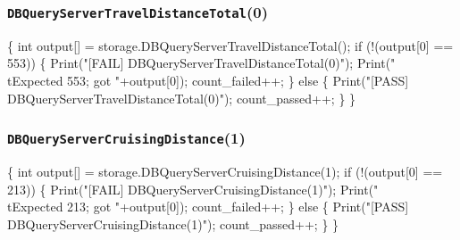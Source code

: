 \documentclass{article}
\def\nwendcode{\endtrivlist \endgroup}
\let\nwdocspar=\par
\theoremstyle{definition}
\begin{document}
\subsubsection{{\tt{}DBQueryServerTravelDistanceTotal}(0)}
\nwenddocs{}\endmoddef{}
\{
  int output[] = storage.DBQueryServerTravelDistanceTotal();
  if (!(output[0] == 553)) \{
    Print("[FAIL] DBQueryServerTravelDistanceTotal(0)");
    Print("\\tExpected 553; got "+output[0]);
    count_failed++;
  \} else \{
    Print("[PASS] DBQueryServerTravelDistanceTotal(0)");
    count_passed++;
  \}
\}
\nwendcode{}\nwdocspar
\subsubsection{{\tt{}DBQueryServerCruisingDistance}(1)}
\nwenddocs{}\endmoddef{}
\{
  int output[] = storage.DBQueryServerCruisingDistance(1);
  if (!(output[0] == 213)) \{
    Print("[FAIL] DBQueryServerCruisingDistance(1)");
    Print("\\tExpected 213; got "+output[0]);
    count_failed++;
  \} else \{
    Print("[PASS] DBQueryServerCruisingDistance(1)");
    count_passed++;
  \}
\}
\nwendcode{}\nwdocspar
\end{document}
